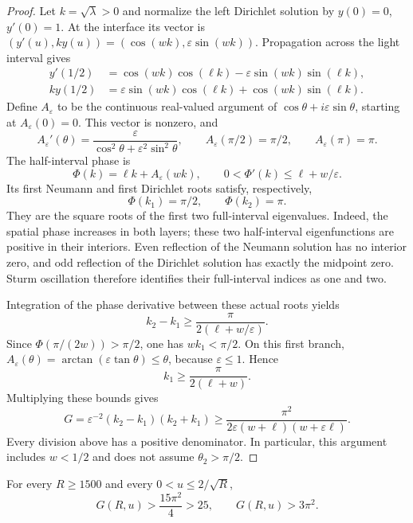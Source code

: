 \begin{proof}
Let $k=\sqrt\lambda>0$ and normalize the left Dirichlet solution by
$y(0)=0$, $y'(0)=1$. At the interface its vector is
$(y'(u),ky(u))=(\cos(wk),\varepsilon\sin(wk))$.
Propagation across the light interval gives
\begin{align*}
 y'(1/2)&=\cos(wk)\cos(\ell k)
          -\varepsilon\sin(wk)\sin(\ell k),\\
 ky(1/2)&=\varepsilon\sin(wk)\cos(\ell k)
          +\cos(wk)\sin(\ell k).
\end{align*}
Define $A_\varepsilon$ to be the continuous real-valued argument of
$\cos\theta+i\varepsilon\sin\theta$, starting at
$A_\varepsilon(0)=0$. This vector is nonzero, and
\[
 A_\varepsilon'(\theta)=
 \frac{\varepsilon}{\cos^2\theta+\varepsilon^2\sin^2\theta},
 \qquad A_\varepsilon(\pi/2)=\pi/2,
 \qquad A_\varepsilon(\pi)=\pi.
\]
The half-interval phase is
\[
 \Phi(k)=\ell k+A_\varepsilon(wk),\qquad
 0<\Phi'(k)\le\ell+w/\varepsilon.
\]
Its first Neumann and first Dirichlet roots satisfy, respectively,
\[
 \Phi(k_1)=\pi/2,\qquad \Phi(k_2)=\pi.
\]
They are the square roots of the first two full-interval eigenvalues.
Indeed, the spatial phase increases in both layers; these two
half-interval eigenfunctions are positive in their interiors.
Even reflection of the Neumann solution has no interior zero, and
odd reflection of the Dirichlet solution has exactly the midpoint zero.
Sturm oscillation therefore identifies their full-interval indices as
one and two.

Integration of the phase derivative between these actual roots yields
\[
 k_2-k_1\ge\frac{\pi}{2(\ell+w/\varepsilon)}.
\]
Since $\Phi(\pi/(2w))>\pi/2$, one has $wk_1<\pi/2$.
On this first branch,
$A_\varepsilon(\theta)=\arctan(\varepsilon\tan\theta)\le\theta$,
because $\varepsilon\le1$. Hence
\[
 k_1\ge\frac{\pi}{2(\ell+w)}.
\]
Multiplying these bounds gives
\[
 G=\varepsilon^{-2}(k_2-k_1)(k_2+k_1)
 \ge\frac{\pi^2}{2\varepsilon(w+\ell)(w+\varepsilon\ell)}.
\]
Every division above has a positive denominator. In particular, this
argument includes $w<1/2$ and does not assume $\theta_2>\pi/2$.
\end{proof}

\begin{lemma}\label{lem:sliver}
For every $R\ge1500$ and every $0<u\le2/\sqrt R$,
\begin{equation}
 G(R,u)>\frac{15\pi^2}{4}>25,
 \qquad G(R,u)>3\pi^2.
 \label{eq:r8-sliver-margin}
\end{equation}
\end{lemma}

